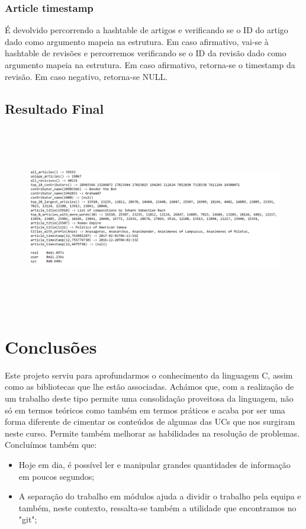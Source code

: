 \documentclass[a4paper]{article}
\begin{document}
\subsubsection{Article timestamp}
É devolvido percorrendo a hashtable de artigos e verificando se o ID do artigo dado como argumento mapeia na estrutura. Em caso afirmativo, vai-se à hashtable de revisões e percorremos verificando se o ID da revisão dado como argumento mapeia na estrutura. Em caso afirmativo, retorna-se o timestamp da revisão. Em caso negativo, retorna-se NULL.

\subsection{Resultado Final}

\begin{figure}[htbp]
    \centering
    \includegraphics[width = 420pt, height = 230pt]{output}
\end{figure}

\section{Conclusões}
\label{sec:conclusao}
Este projeto serviu para aprofundarmos o conhecimento da linguagem C, assim como as bibliotecas que lhe estão associadas. Achámos que, com a realização de um trabalho deste tipo permite uma consolidação proveitosa da linguagem, não só em termos teóricos como também em termos práticos e acaba por ser uma forma diferente de cimentar os conteúdos de algumas das UCs que nos surgiram neste curso. Permite também melhorar as habilidades na resolução de problemas. Concluímos também que:

\begin{itemize} 
        \item Hoje em dia, é possível ler e manipular grandes quantidades de informação em poucos segundos;
 	    \item A separação do trabalho em módulos ajuda a dividir o trabalho pela equipa e também, neste contexto, ressalta-se também a utilidade que encontramos no "git";
\end{itemize}
\end{document}
